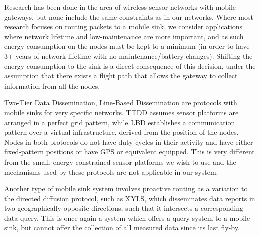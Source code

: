 Research has been done in the area of wireless sensor networks with mobile
gateways, but none include the same constraints as in our networks. Where most
research focuses on routing packets to a mobile sink, we consider applications
where network lifetime and low-maintenance are more important, and as such
energy consumption on the nodes must be kept to a minimum (in order to have 3+
years of network lifetime with no maintenance/battery changes). Shifting the
energy consumption to the sink is a direct consequence of this decision, under
the assumption that there exists a flight path that allows the gateway to
collect information from all the nodes. 

Two-Tier Data Dissemination\cite{ttdd}, Line-Based Dissemination\cite{lbd} are
protocols with mobile sinks for very specific networks. TTDD assumes sensor
platforms are arranged in a perfect grid pattern, while LBD establishes a
communication pattern over a virtual infrastructure, derived from the position
of the nodes. Nodes in both protocols do not have duty-cycles in their activity
and have either fixed-pattern positions or have GPS or equivalent equipped. This
is very different from the small, energy constrained sensor platforms we wish to
use and the mechanisms used by these protocols are not applicable in our system.

Another type of mobile sink system involves proactive routing as a variation to
the directed diffusion protocol\cite{dirduf}, such as XYLS\cite{xyls}, which
disseminates data reports in two geographically-opposite directions, such that
it intersects a corresponding data query. This is once again a system which
offers a query system to a mobile sink, but cannot offer the collection of all
measured data since its last fly-by.

